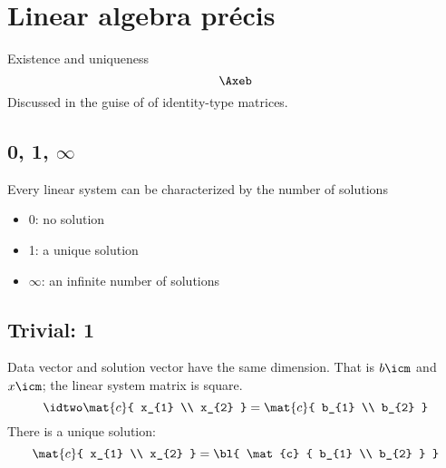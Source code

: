 \chapter{Linear algebra pr\'ecis}
Existence and uniqueness
  \begin{equation}
    \Axeb
  \end{equation}
Discussed in the guise of  of identity-type matrices.

\section{0, 1, $\infty$}   %
Every linear system can be characterized by the number of solutions
\begin{itemize}
\item 0: no solution
\item 1: a unique solution
\item $\infty$: an infinite number of solutions
\end{itemize}

\section{Trivial: 1}   %
Data vector and solution vector have the same dimension. That is $b\icm$ and $x\icm$; the linear system matrix is square.
  \begin{equation}
    \idtwo
    \mat{c} { x_{1} \\ x_{2} } =
    \mat{c} { b_{1} \\ b_{2} }    
  \end{equation}
There is a unique solution:
  \begin{equation}
    \mat{c} { x_{1} \\ x_{2} } = \bl{ \mat{c} { b_{1} \\ b_{2} } }
  \end{equation}


